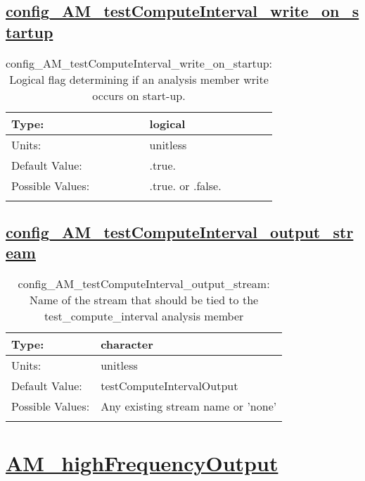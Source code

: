 \subsection[config\_AM\_testComputeInterval\_write\_on\_startup]{\hyperref[sec:nm_tab_AM_testComputeInterval]{config\_AM\_testComputeInterval\_write\_on\_startup}}
\label{subsec:nm_sec_config_AM_testComputeInterval_write_on_startup}
\begin{center}
\begin{longtable}{| p{2.0in} || p{4.0in} |}
    \hline
    Type: & logical \\
    \hline
    Units: & \si{unitless} \\
    \hline
    Default Value: & .true. \\
    \hline
    Possible Values: & .true. or .false. \\
    \hline
    \caption{config\_AM\_testComputeInterval\_write\_on\_startup: Logical flag determining if an analysis member write occurs on start-up.}
\end{longtable}
\end{center}
\subsection[config\_AM\_testComputeInterval\_output\_stream]{\hyperref[sec:nm_tab_AM_testComputeInterval]{config\_AM\_testComputeInterval\_output\_stream}}
\label{subsec:nm_sec_config_AM_testComputeInterval_output_stream}
\begin{center}
\begin{longtable}{| p{2.0in} || p{4.0in} |}
    \hline
    Type: & character \\
    \hline
    Units: & \si{unitless} \\
    \hline
    Default Value: & testComputeIntervalOutput \\
    \hline
    Possible Values: & Any existing stream name or 'none' \\
    \hline
    \caption{config\_AM\_testComputeInterval\_output\_stream: Name of the stream that should be tied to the test\_compute\_interval analysis member}
\end{longtable}
\end{center}
\section[AM\_highFrequencyOutput]{\hyperref[sec:nm_tab_AM_highFrequencyOutput]{AM\_highFrequencyOutput}}
\label{sec:nm_sec_AM_highFrequencyOutput}
